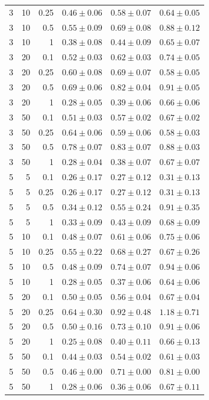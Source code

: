 \begin{table}[htbp]
\begin{tabular}{@{}rrrccc@{}}
3 & 10 & 0.25 & $0.46 \pm 0.06$ & $0.58 \pm 0.07$ & $0.64 \pm 0.05$ \\
3 & 10 & 0.5 & $0.55 \pm 0.09$ & $0.69 \pm 0.08$ & $0.88 \pm 0.12$ \\
3 & 10 & 1 & $0.38 \pm 0.08$ & $0.44 \pm 0.09$ & $0.65 \pm 0.07$ \\
3 & 20 & 0.1 & $0.52 \pm 0.03$ & $0.62 \pm 0.03$ & $0.74 \pm 0.05$ \\
3 & 20 & 0.25 & $0.60 \pm 0.08$ & $0.69 \pm 0.07$ & $0.58 \pm 0.05$ \\
3 & 20 & 0.5 & $0.69 \pm 0.06$ & $0.82 \pm 0.04$ & $0.91 \pm 0.05$ \\
3 & 20 & 1 & $0.28 \pm 0.05$ & $0.39 \pm 0.06$ & $0.66 \pm 0.06$ \\
3 & 50 & 0.1 & $0.51 \pm 0.03$ & $0.57 \pm 0.02$ & $0.67 \pm 0.02$ \\
3 & 50 & 0.25 & $0.64 \pm 0.06$ & $0.59 \pm 0.06$ & $0.58 \pm 0.03$ \\
3 & 50 & 0.5 & $0.78 \pm 0.07$ & $0.83 \pm 0.07$ & $0.88 \pm 0.03$ \\
3 & 50 & 1 & $0.28 \pm 0.04$ & $0.38 \pm 0.07$ & $0.67 \pm 0.07$ \\
\midrule
5 & 5 & 0.1 & $0.26 \pm 0.17$ & $0.27 \pm 0.12$ & $0.31 \pm 0.13$ \\
5 & 5 & 0.25 & $0.26 \pm 0.17$ & $0.27 \pm 0.12$ & $0.31 \pm 0.13$ \\
5 & 5 & 0.5 & $0.34 \pm 0.12$ & $0.55 \pm 0.24$ & $0.91 \pm 0.35$ \\
5 & 5 & 1 & $0.33 \pm 0.09$ & $0.43 \pm 0.09$ & $0.68 \pm 0.09$ \\
5 & 10 & 0.1 & $0.48 \pm 0.07$ & $0.61 \pm 0.06$ & $0.75 \pm 0.06$ \\
5 & 10 & 0.25 & $0.55 \pm 0.22$ & $0.68 \pm 0.27$ & $0.67 \pm 0.26$ \\
5 & 10 & 0.5 & $0.48 \pm 0.09$ & $0.74 \pm 0.07$ & $0.94 \pm 0.06$ \\
5 & 10 & 1 & $0.28 \pm 0.05$ & $0.37 \pm 0.06$ & $0.64 \pm 0.06$ \\
5 & 20 & 0.1 & $0.50 \pm 0.05$ & $0.56 \pm 0.04$ & $0.67 \pm 0.04$ \\
5 & 20 & 0.25 & $0.64 \pm 0.30$ & $0.92 \pm 0.48$ & $1.18 \pm 0.71$ \\
5 & 20 & 0.5 & $0.50 \pm 0.16$ & $0.73 \pm 0.10$ & $0.91 \pm 0.06$ \\
5 & 20 & 1 & $0.25 \pm 0.08$ & $0.40 \pm 0.11$ & $0.66 \pm 0.13$ \\
5 & 50 & 0.1 & $0.44 \pm 0.03$ & $0.54 \pm 0.02$ & $0.61 \pm 0.03$ \\
5 & 50 & 0.5 & $0.46 \pm 0.00$ & $0.71 \pm 0.00$ & $0.81 \pm 0.00$ \\
5 & 50 & 1 & $0.28 \pm 0.06$ & $0.36 \pm 0.06$ & $0.67 \pm 0.11$ \\
\bottomrule
\end{tabular}
\end{table}
